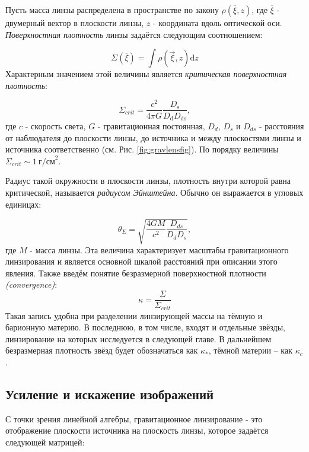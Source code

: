 Пусть масса линзы распределена в пространстве по закону $\rho(\overline \xi, z)$, где $\overline \xi$ - двумерный вектор в плоскости линзы, $z$ - координата вдоль оптической оси. \textit{Поверхностная плотность} линзы задаётся следующим соотношением:

\begin{equation}\label{sigmasurf}
\Sigma(\overline{\xi})=\int \rho(\vec{\xi}, z) \mathrm{d} z
\end{equation}
Характерным значением этой величины является \textit{критическая поверхностная плотность}:

\begin{equation}\label{sigmacrit}
\Sigma_{crit}=\frac{c^{2}}{4 \pi G} \frac{D_{\mathrm{s}}}{D_{\mathrm{d}} D_{\mathrm{ds}}},
\end{equation}
где $c$ - скорость света, $G$ - гравитационная постоянная, $D_d$, $D_s$ и $D_{ds}$ - расстояния от наблюдателя до плоскости линзы, до источника и между плоскостями линзы и источника соответственно (см. Рис. \ref{fig:gravlensfig}). По порядку величины $\Sigma_{crit} \sim 1 \ \textrm{г/см}^2$.

Радиус такой окружности в плоскости линзы, плотность внутри которой равна критической, называется \textit{радиусом Эйнштейна}. Обычно он выражается в угловых единицах: 

\begin{equation}\label{r_ein}
\theta_{E}=\sqrt{\frac{4 G M}{c^{2}} \frac{D_{d s}}{D_{d} D_{s}}},
\end{equation}
где $M$ - масса линзы. Эта величина характеризует масштабы гравитационного линзирования и является основной шкалой расстояний при описании этого явления. Также введём понятие безразмерной поверхностной плотности \textit{(convergence)}:
\begin{equation}\label{convergence}
\kappa = \frac{\Sigma}{\Sigma_{crit}}
\end{equation}
Такая запись удобна при разделении линзирующей массы на тёмную и барионную материю. В последнюю, в том числе, входят и отдельные звёзды, линзирование на которых исследуется в следующей главе. В дальнейшем безразмерная плотность звёзд будет обозначаться как $\kappa_*$, тёмной материи -- как $\kappa_c$.

\subsection{Усиление и искажение изображений}

С точки зрения линейной алгебры, гравитационное линзирование - это отображение плоскости источника на плоскость линзы, которое задаётся следующей матрицей:

